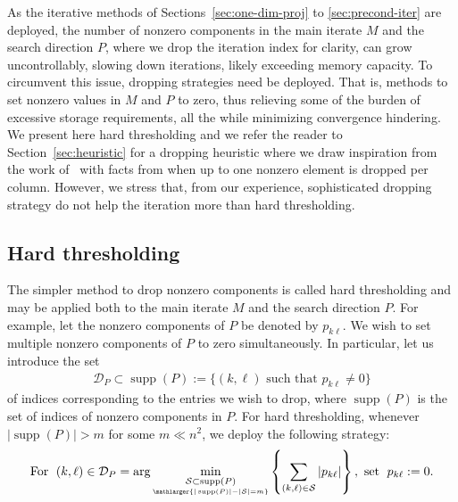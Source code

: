 \documentclass[numbers,webpdf,imanum]{ima-authoring-template}%
\theoremstyle{thmstyletwo}%
\numberwithin{equation}{section}
\begin{document}
As the iterative methods of Sections~\ref{sec:one-dim-proj} to \ref{sec:precond-iter} are deployed, the number of nonzero components in the main iterate $M$ and the search direction $P$, where we drop the iteration index for clarity, can grow uncontrollably, slowing down iterations, likely exceeding memory capacity.
To circumvent this issue, dropping strategies need be deployed.
That is, methods to set nonzero values in $M$ and $P$ to zero, thus relieving some of the burden of excessive storage requirements, all the while minimizing convergence hindering.
We present here hard thresholding and we refer the reader to Section~\ref{sec:heuristic} for a dropping heuristic where we draw inspiration from the work of~\cite{Chow1998ApproximateIP} with facts from when up to one nonzero element is dropped per column. 
However, we stress that, from our experience, sophisticated dropping strategy do not help the iteration more than hard thresholding.

\subsection{Hard thresholding}
The simpler method to drop nonzero components is called hard thresholding and may be applied both to the main iterate $M$ and the search direction $P$.
For example, let the nonzero components of $P$ be denoted by $p_{k\ell}$.
We wish to set multiple nonzero components of $P$ to zero simultaneously.
In particular, let us introduce the set
\begin{align}\label{eq:440}
\mathcal{D}_P\subset\operatorname{supp}(P):=\{(k,\ell)\text{ such that }p_{k\ell}\neq 0\}
\end{align}
of indices corresponding to the entries we wish to drop, where $\operatorname{supp}(P)$ is the set of indices of nonzero components in $P$.
For hard thresholding, whenever $|\operatorname{supp}(P)|>m$ for some $m\ll n^2$, we deploy the following strategy:
\begin{align}\label{eq:445}
\text{For }\;(k,\ell)\in
\mathcal{D}_P=
\arg
\underset{\underset{\mathlarger{|\operatorname{supp}(P)|-|\mathcal{S}|=m}}{\mathcal{S}\subset \operatorname{supp}(P)}}{\min}
\left\{
\sum_{(k,\ell)\in\mathcal{S}}
|p_{k\ell}|
\right\},
\text{ set }\;
p_{k\ell}:=0.
\end{align}
\end{document}
